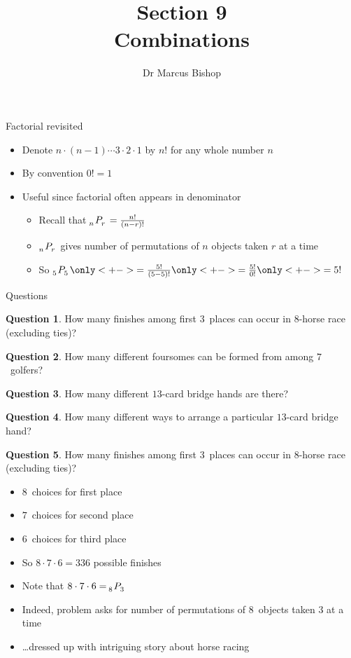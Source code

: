 \documentclass{beamer}
\title[\S9]{Section 9\\Combinations}
\author{Dr Marcus Bishop}
\theoremstyle{definition}
\newtheorem{question}{Question}
\newcommand\npr[2]{\tensor[_{#1}]P{_{#2}}}
\begin{document}
\begin{frame}\titlepage\end{frame}
\LogoOff

\begin{frame}{Factorial revisited}
\begin{itemize}
\item Denote $n\cdot\left(n-1\right)\cdots 3\cdot 2\cdot 1$
by \alert{$n!$} for any whole number $n$
\item By convention $0!=1$
\item Useful since factorial often appears in denominator
\begin{example}
\begin{itemize}
\item Recall that $\npr{n}{r}=\frac{n!}{\left(n-r\right)!}$
\item $\npr{n}{r}$ gives number of permutations of $n$
objects taken $r$ at a time
\item So $\npr{5}{5}
\only<+->{=\frac{5!}{\left(5-5\right)!}}
\only<+->{=\frac{5!}{0!}}
\only<+->{=5!}$
\end{itemize}
\end{example}
\end{itemize}
\end{frame}

\begin{frame}{Questions}
\begin{question}
How many finishes among first $3$~places
can occur in $8$-horse race (excluding ties)?
\end{question}
\begin{question}
How many different foursomes can be formed
from among $7$~golfers?
\end{question}
\begin{question}
How many different $13$-card bridge hands are there?
\end{question}
\begin{question}
How many different ways to arrange a particular $13$-card
bridge hand?
\end{question}
\end{frame}

\begin{frame}
\begin{question}
How many finishes among first $3$~places
can occur in $8$-horse race (excluding ties)?
\end{question}
\begin{itemize}
\item $8$~choices for first place
\item $7$~choices for second place
\item $6$~choices for third place
\item So $8\cdot 7\cdot 6=336$ possible finishes
\item Note that $8\cdot 7\cdot 6=\npr{8}{3}$
\item Indeed, problem asks for number of permutations
of $8$~objects taken $3$ at a time
\item \dots dressed up with intriguing story about horse racing
\end{itemize}
\end{frame}
\end{document}
